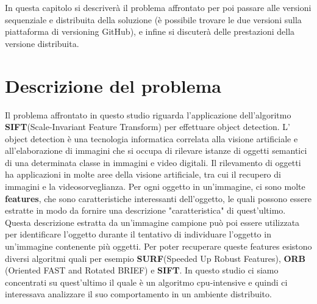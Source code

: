 In questa capitolo si descriverà il problema affrontato per poi passare alle versioni sequenziale e distribuita della soluzione (è possibile trovare le due versioni sulla piattaforma di versioning GitHub), e infine si discuterà delle prestazioni della versione distribuita.
\section{Descrizione del problema}
Il problema affrontato in questo studio riguarda l'applicazione dell'algoritmo \textbf{SIFT}(Scale-Invariant Feature Transform) per effettuare object detection. L' object detection è una tecnologia informatica correlata alla visione artificiale e all'elaborazione di immagini che si occupa di rilevare istanze di oggetti semantici di una determinata classe in immagini e video digitali. Il rilevamento di oggetti ha applicazioni in molte aree della visione artificiale, tra cui il recupero di immagini e la videosorveglianza. Per ogni oggetto in un'immagine, ci sono molte \textbf{features}, che sono caratteristiche interessanti dell'oggetto, le quali possono essere estratte in modo da fornire una descrizione "caratteristica" di quest'ultimo. Questa descrizione estratta da un'immagine campione può poi essere utilizzata per identificare l'oggetto durante il tentativo di individuare l'oggetto in un'immagine contenente più oggetti. Per poter recuperare queste features esistono diversi algoritmi quali per esempio \textbf{SURF}(Speeded Up Robust Features), \textbf{ORB} (Oriented FAST and Rotated BRIEF) e \textbf{SIFT}. In questo studio ci siamo concentrati su quest'ultimo il quale è un algoritmo cpu-intensive e quindi ci interessava analizzare il suo comportamento in un ambiente distribuito.

